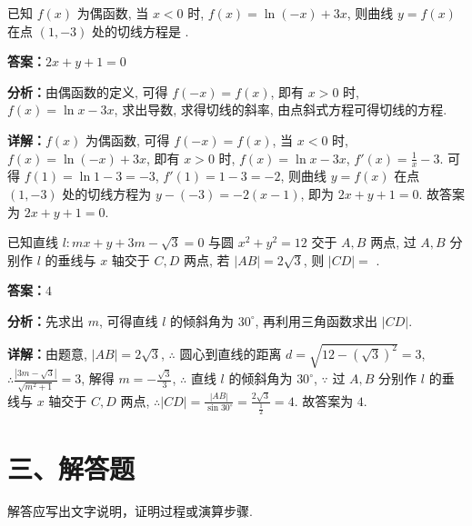\begin{question}[points=5]
已知 $f(x)$ 为偶函数, 当 $x<0$ 时, $f(x)=\ln(-x)+3x$, 则曲线 $y=f(x)$ 在点 $(1,-3)$ 处的切线方程是 .
\fillin[{$2x+y+1=0$}]
\begin{solution}
\textbf{答案：}$2x+y+1=0$

\textbf{分析：}由偶函数的定义, 可得 $f(-x)=f(x)$, 即有 $x>0$ 时, $f(x)=\ln x-3x$, 求出导数, 求得切线的斜率, 由点斜式方程可得切线的方程.

\textbf{详解：}$f(x)$ 为偶函数, 可得 $f(-x)=f(x)$, 当 $x<0$ 时, $f(x)=\ln(-x)+3x$, 即有 $x>0$ 时, $f(x)=\ln x-3x$, $f'(x)=\frac{1}{x}-3$. 可得 $f(1)=\ln1-3=-3$, $f'(1)=1-3=-2$, 则曲线 $y=f(x)$ 在点 $(1,-3)$ 处的切线方程为 $y-(-3)=-2(x-1)$, 即为 $2x+y+1=0$. 故答案为 $2x+y+1=0$.
\end{solution}
\end{question}

\begin{question}[points=5]
已知直线 $l:mx+y+3m-\sqrt{3}=0$ 与圆 $x^2+y^2=12$ 交于 $A,B$ 两点, 过 $A,B$ 分别作 $l$ 的垂线与 $x$ 轴交于 $C,D$ 两点, 若 $|AB|=2\sqrt{3}$, 则 $|CD|=$ .
\fillin[{$4$}]
\begin{solution}
\textbf{答案：}$4$

\textbf{分析：}先求出 $m$, 可得直线 $l$ 的倾斜角为 $30^\circ$, 再利用三角函数求出 $|CD|$.

\textbf{详解：}由题意, $|AB|=2\sqrt{3}$, $\therefore$ 圆心到直线的距离 $d=\sqrt{12-(\sqrt{3})^2}=3$, $\therefore \frac{|3m-\sqrt{3}|}{\sqrt{m^2+1}}=3$, 解得 $m=-\frac{\sqrt{3}}{3}$, $\therefore$ 直线 $l$ 的倾斜角为 $30^\circ$, $\because$ 过 $A,B$ 分别作 $l$ 的垂线与 $x$ 轴交于 $C,D$ 两点, $\therefore |CD|=\frac{|AB|}{\sin30^\circ}=\frac{2\sqrt{3}}{\frac{1}{2}}=4$. 故答案为 $4$.
\end{solution}
\end{question}

\section*{三、解答题}
解答应写出文字说明，证明过程或演算步骤.

